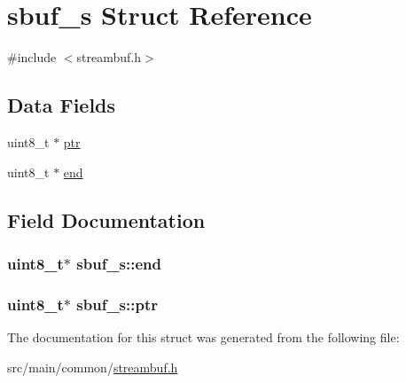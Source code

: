 \hypertarget{structsbuf__s}{\section{sbuf\+\_\+s Struct Reference}
\label{structsbuf__s}
}


{\ttfamily \#include $<$streambuf.\+h$>$}

\subsection*{Data Fields}
\begin{DoxyCompactItemize}
\item 
uint8\+\_\+t $\ast$ \hyperlink{structsbuf__s_ad64aee267220435d87109c9b85aefbfb}{ptr}
\item 
uint8\+\_\+t $\ast$ \hyperlink{structsbuf__s_a772c8a5f512819f1e24c46affbfd05eb}{end}
\end{DoxyCompactItemize}


\subsection{Field Documentation}
\hypertarget{structsbuf__s_a772c8a5f512819f1e24c46affbfd05eb}{
\subsubsection[{end}]{\setlength{\rightskip}{0pt plus 5cm}uint8\+\_\+t$\ast$ sbuf\+\_\+s\+::end}}\label{structsbuf__s_a772c8a5f512819f1e24c46affbfd05eb}
\hypertarget{structsbuf__s_ad64aee267220435d87109c9b85aefbfb}{
\subsubsection[{ptr}]{\setlength{\rightskip}{0pt plus 5cm}uint8\+\_\+t$\ast$ sbuf\+\_\+s\+::ptr}}\label{structsbuf__s_ad64aee267220435d87109c9b85aefbfb}


The documentation for this struct was generated from the following file\+:\begin{DoxyCompactItemize}
\item 
src/main/common/\hyperlink{streambuf_8h}{streambuf.\+h}\end{DoxyCompactItemize}
